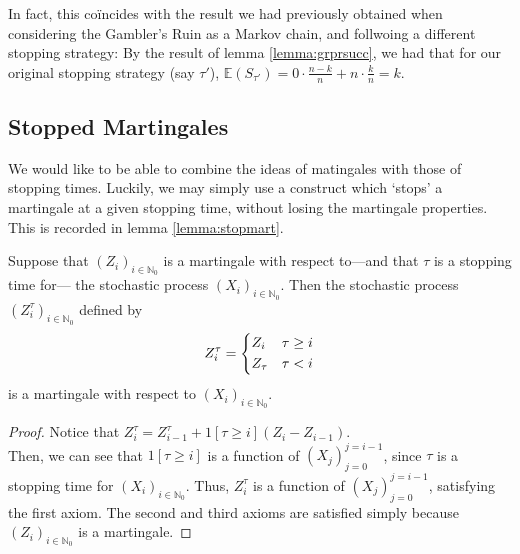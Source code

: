 	In fact, this co\"incides with the result we had previously obtained when considering the 
	Gambler's Ruin as a Markov chain, and follwoing a different stopping strategy: By the 
	result of lemma \ref{lemma:grprsucc}, we had that for our original stopping strategy (say 
	$\tau'$), $\mathbb{E}(S_{\tau'}) = 0 \cdot \frac{n-k}{n} + n \cdot \frac{k}{n} = k$.  

	\subsection{Stopped Martingales}
	We would like to be able to combine the ideas of matingales with those of stopping times.
	Luckily, we may simply use a construct which `stops' a martingale at a given stopping time,
	without losing the martingale properties. This is recorded in lemma \ref{lemma:stopmart}.
	\begin{lemma}
		\label{lemma:stopmart}
		Suppose that $(Z_i)_{i\in\mathbb{N}_0}$ is a martingale with respect to---and that 
		$\tau$ is a stopping time for--- the stochastic process $(X_i)_{i\in\mathbb{N}_0}$.
		Then the stochastic process $(Z^\tau_i)_{i\in\mathbb{N}_0}$ defined by 
		$$
			Z^\tau_i = 
			\begin{dcases}
				Z_i & \tau \geq i \\
				Z_\tau & \tau < i
			\end{dcases}
		$$
		is a martingale with respect to $(X_i)_{i\in\mathbb{N}_0}$.
	\end{lemma}
	\begin{proof}
		Notice that $Z^\tau_i = Z^\tau_{i-1} + 1[\tau \geq i](Z_i - Z_{i-1})$.\\
		Then, we can see that $1[\tau \geq i]$ is a function of $(X_j)_{j=0}^{j=i-1}$,
		since $\tau$ is a stopping time for $(X_i)_{i\in\mathbb{N}_0}$. Thus, $Z_i^\tau$ is
		a function of $(X_j)_{j=0}^{j=i-1}$, satisfying the first axiom. The second and 
		third axioms are satisfied simply because $(Z_i)_{i\in\mathbb{N}_0}$ is a martingale.
	\end{proof}
	
